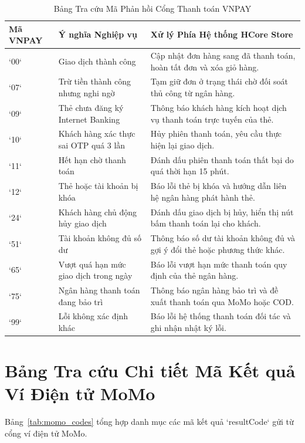 \documentclass[12pt,a4paper]{report}
\begin{document}
\begin{table}[H]
\centering
\caption{Bảng Tra cứu Mã Phản hồi Cổng Thanh toán VNPAY}
\label{tab:vnpay_codes}
\begin{tabularx}{\textwidth}{p{2.2cm}p{4.5cm}X}
\toprule
\textbf{Mã VNPAY} & \textbf{Ý nghĩa Nghiệp vụ} & \textbf{Xử lý Phía Hệ thống HCore Store} \\
\midrule
`00` & Giao dịch thành công & Cập nhật đơn hàng sang đã thanh toán, hoàn tất đơn và xóa giỏ hàng. \\
\addlinespace
`07` & Trừ tiền thành công nhưng nghi ngờ & Tạm giữ đơn ở trạng thái chờ đối soát thủ công từ ngân hàng. \\
\addlinespace
`09` & Thẻ chưa đăng ký Internet Banking & Thông báo khách hàng kích hoạt dịch vụ thanh toán trực tuyến của thẻ. \\
\addlinespace
`10` & Khách hàng xác thực sai OTP quá 3 lần & Hủy phiên thanh toán, yêu cầu thực hiện lại giao dịch. \\
\addlinespace
`11` & Hết hạn chờ thanh toán & Đánh dấu phiên thanh toán thất bại do quá thời hạn 15 phút. \\
\addlinespace
`12` & Thẻ hoặc tài khoản bị khóa & Báo lỗi thẻ bị khóa và hướng dẫn liên hệ ngân hàng phát hành thẻ. \\
\addlinespace
`24` & Khách hàng chủ động hủy giao dịch & Đánh dấu giao dịch bị hủy, hiển thị nút bấm thanh toán lại cho khách. \\
\addlinespace
`51` & Tài khoản không đủ số dư & Thông báo số dư tài khoản không đủ và gợi ý đổi thẻ hoặc phương thức khác. \\
\addlinespace
`65` & Vượt quá hạn mức giao dịch trong ngày & Báo lỗi vượt hạn mức thanh toán quy định của thẻ ngân hàng. \\
\addlinespace
`75` & Ngân hàng thanh toán đang bảo trì & Thông báo ngân hàng bảo trì và đề xuất thanh toán qua MoMo hoặc COD. \\
\addlinespace
`99` & Lỗi không xác định khác & Báo lỗi hệ thống thanh toán đối tác và ghi nhận nhật ký lỗi. \\
\bottomrule
\end{tabularx}
\end{table}

\section{Bảng Tra cứu Chi tiết Mã Kết quả Ví Điện tử MoMo}
Bảng~\ref{tab:momo_codes} tổng hợp danh mục các mã kết quả `resultCode` gửi từ cổng ví điện tử MoMo.
\end{document}
